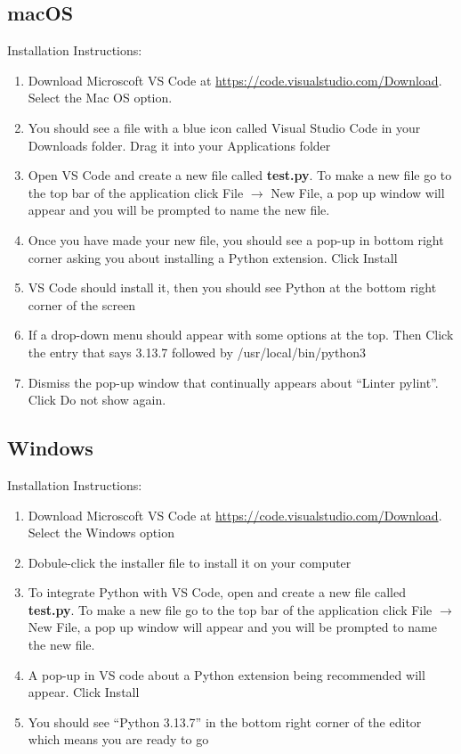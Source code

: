 \documentclass[12pt]{article}
\begin{document}
\subsection{macOS}
Installation Instructions: 
\begin{enumerate}
\item Download Microscoft VS Code at \url{https://code.visualstudio.com/Download}. Select the Mac OS option.
\item You should see a file with a blue icon called Visual Studio Code in your Downloads folder. Drag it into your Applications folder
\item Open VS Code and create a new file called \textbf{test.py}. To make a new file go to the top bar of the application click File $\rightarrow$ New File, a pop up window will appear and you will be prompted to name the new file.
  \item Once you have made your new file, you should see a pop-up in bottom right corner asking you about installing a Python extension. Click Install
\item VS Code should install it, then you should see Python at the bottom right corner of the screen
\item If a drop-down menu should appear with some options at the top. Then Click the entry that says 3.13.7 followed by /usr/local/bin/python3
\item Dismiss the pop-up window that continually appears about ``Linter pylint''. Click Do not show again.
\end{enumerate}

\subsection{Windows}
Installation Instructions: 
\begin{enumerate}
\item Download Microscoft VS Code at \url{https://code.visualstudio.com/Download}. Select the Windows option
\item Dobule-click the installer file to install it on your computer
\item To integrate Python with VS Code, open and create a new file called \textbf{test.py}. To make a new file go to the top bar of the application click File $\rightarrow$ New File, a pop up window will appear and you will be prompted to name the new file.
\item A pop-up in VS code about a Python extension being recommended will appear. Click Install
\item You should see ``Python 3.13.7'' in the bottom right corner of the editor which means you are ready to go
\end{enumerate}
\end{document}

